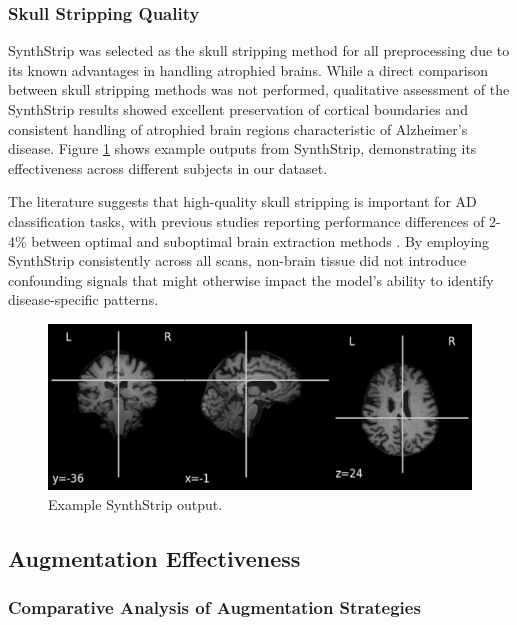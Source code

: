 \documentclass[12pt, a4paper]{article}
\begin{document}
\subsubsection{Skull Stripping Quality}

SynthStrip was selected as the skull stripping method for all preprocessing due to its known advantages in handling atrophied brains. While a direct comparison between skull stripping methods was not performed, qualitative assessment of the SynthStrip results showed excellent preservation of cortical boundaries and consistent handling of atrophied brain regions characteristic of Alzheimer's disease. Figure \ref{fig:skull_stripping_comparison} shows example outputs from SynthStrip, demonstrating its effectiveness across different subjects in our dataset.

The literature suggests that high-quality skull stripping is important for AD classification tasks, with previous studies reporting performance differences of 2-4\% between optimal and suboptimal brain extraction methods \cite{hoopes2022synthstrip}. By employing SynthStrip consistently across all scans, non-brain tissue did not introduce confounding signals that might otherwise impact the model's ability to identify disease-specific patterns.

\begin{figure}[htbp]
  \centering
  \includegraphics[width=\textwidth]{figures/ss.png}
  \caption{Example SynthStrip output.}
  \label{fig:skull_stripping_comparison}
\end{figure}

\subsection{Augmentation Effectiveness}

\subsubsection{Comparative Analysis of Augmentation Strategies}
\end{document}
